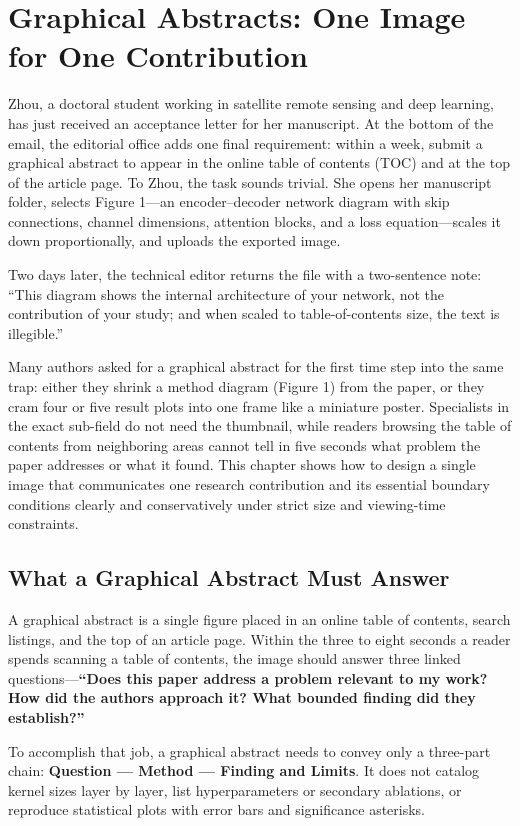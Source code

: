 \chapter{Graphical Abstracts: One Image for One Contribution}

Zhou, a doctoral student working in satellite remote sensing and deep learning, has just received an acceptance letter for her manuscript. At the bottom of the email, the editorial office adds one final requirement: within a week, submit a graphical abstract to appear in the online table of contents (TOC) and at the top of the article page. To Zhou, the task sounds trivial. She opens her manuscript folder, selects Figure 1---an encoder--decoder network diagram with skip connections, channel dimensions, attention blocks, and a loss equation---scales it down proportionally, and uploads the exported image.

Two days later, the technical editor returns the file with a two-sentence note: ``This diagram shows the internal architecture of your network, not the contribution of your study; and when scaled to table-of-contents size, the text is illegible.''

Many authors asked for a graphical abstract for the first time step into the same trap: either they shrink a method diagram (Figure 1) from the paper, or they cram four or five result plots into one frame like a miniature poster. Specialists in the exact sub-field do not need the thumbnail, while readers browsing the table of contents from neighboring areas cannot tell in five seconds what problem the paper addresses or what it found. This chapter shows how to design a single image that communicates one research contribution and its essential boundary conditions clearly and conservatively under strict size and viewing-time constraints.

\section{What a Graphical Abstract Must Answer}

A graphical abstract is a single figure placed in an online table of contents, search listings, and the top of an article page. Within the three to eight seconds a reader spends scanning a table of contents, the image should answer three linked questions---\textbf{``Does this paper address a problem relevant to my work? How did the authors approach it? What bounded finding did they establish?''}

To accomplish that job, a graphical abstract needs to convey only a three-part chain: \textbf{Question --- Method --- Finding and Limits}. It does not catalog kernel sizes layer by layer, list hyperparameters or secondary ablations, or reproduce statistical plots with error bars and significance asterisks.

